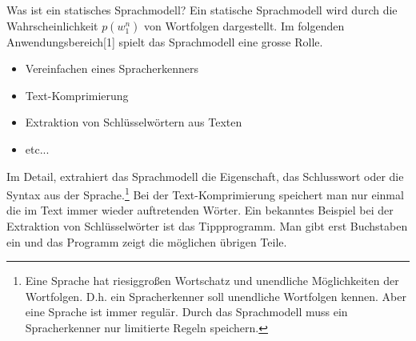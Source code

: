 
Was ist ein statisches Sprachmodell? Ein statische Sprachmodell wird durch die Wahrscheinlichkeit $p(w_{1}^n)$ von Wortfolgen  dargestellt.
Im folgenden Anwendungsbereich[1] spielt das Sprachmodell eine grosse Rolle.
\begin{itemize}
	\item Vereinfachen eines Spracherkenners
	\item Text-Komprimierung
	\item Extraktion von Schl\"usselw\"ortern aus Texten
	\item etc...
\end{itemize}
Im Detail, extrahiert das Sprachmodell die Eigenschaft, das Schlusswort oder die Syntax aus der Sprache.\footnote{Eine Sprache hat riesiggro\ss en Wortschatz und unendliche M\"oglichkeiten der Wortfolgen. D.h. ein Spracherkenner soll unendliche Wortfolgen kennen. Aber eine Sprache ist immer regul\"ar. Durch das Sprachmodell muss ein Spracherkenner  nur  limitierte Regeln speichern.}
Bei der Text-Komprimierung speichert man nur einmal die im Text immer wieder auftretenden W\"orter. Ein bekanntes Beispiel bei der Extraktion von Schl\"usselw\"orter ist das Tippprogramm. Man gibt erst Buchstaben ein und das Programm zeigt die m\"oglichen \"ubrigen Teile.